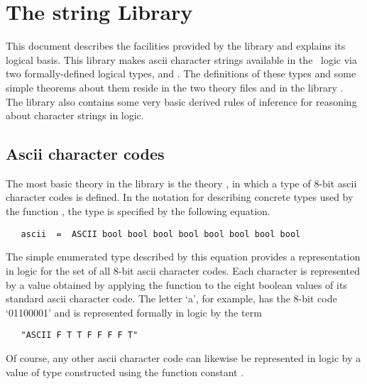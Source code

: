 \chapter{The string Library}

This document describes the facilities provided by the  library and
explains its logical basis. This library makes ascii character strings
available in the \HOL\ logic via two formally-defined logical types, 
and . The definitions of these types and some simple theorems about
them reside in the two theory files  and  in the
library .  The library also contains some very basic derived rules
of inference for reasoning about character strings in logic.

\section{Ascii character codes}

The most basic theory in the library is the theory , in which a type
 of 8-bit ascii character codes is defined.  In the notation for
describing concrete types used by the function , the type
 is specified by the following equation.

\begin{hol}\begin{verbatim}
   ascii  =  ASCII bool bool bool bool bool bool bool bool
\end{verbatim}\end{hol}

\noindent The simple enumerated type  described by this equation
provides a representation in logic for the set of all 8-bit ascii character
codes.  Each character is represented by a value obtained by applying the
function  to the eight boolean values of its standard ascii character
code.  The letter `a', for example, has the 8-bit code `01100001' and is
represented formally in logic by the term

\begin{hol}\begin{verbatim}
   "ASCII F T T F F F F T"
\end{verbatim}\end{hol}

\noindent Of course, any other ascii character code can likewise be represented
in logic by a value of type  constructed using the function constant
.

